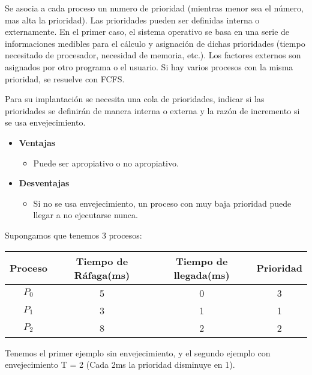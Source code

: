 \documentclass{article}
\begin{document}
Se asocia a cada proceso un numero de prioridad (mientras menor sea el número, mas alta la prioridad).
Las prioridades pueden ser definidas interna o externamente.
En el primer caso, el sistema operativo se basa en una serie de informaciones medibles para el cálculo 
y asignación de dichas prioridades (tiempo necesitado de procesador, necesidad de memoria, etc.). 
Los factores externos son asignados por otro programa o el usuario.
Si hay varios procesos con la misma prioridad, se resuelve con FCFS.

Para su implantación se necesita una cola de prioridades, indicar si las prioridades
se definirán de manera interna o externa y la razón de incremento si se usa
envejecimiento.

\begin{itemize}
	\item \textbf{Ventajas}
	\begin{itemize}
		\item Puede ser apropiativo o no apropiativo.
	\end{itemize}
	
	\item \textbf{Desventajas}
	\begin{itemize}
		\item Si no se usa envejecimiento, un proceso con muy baja prioridad puede llegar
		a no ejecutarse nunca.
	\end{itemize}
\end{itemize}

Supongamos que tenemos 3 procesos:
\begin{center}
	\begin{tabular}{|c|c|c|c|} \hline
		Proceso & Tiempo de Ráfaga(ms) & Tiempo de llegada(ms) & Prioridad \\ \hline
		$P_{0}$ & 5 & 0 & 3 \\ 
		$P_{1}$ & 3 & 1 & 1 \\ 
		$P_{2}$ & 8 & 2 & 2 \\ \hline
	\end{tabular}
\end{center}

Tenemos el primer ejemplo sin envejecimiento, y el segundo ejemplo con 
envejecimiento T = 2 (Cada 2ms la prioridad disminuye en 1).

\vspace{0.4cm}
\end{document}
